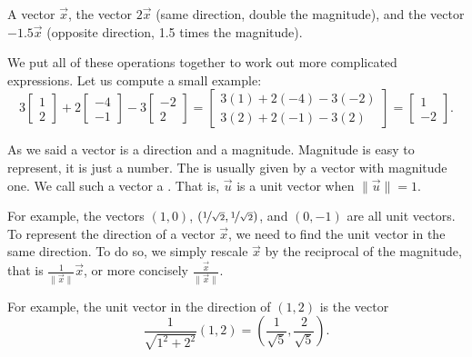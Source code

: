 \documentclass{ximera}
\begin{document}
\begin{myfig}
    \capstart
    
    \caption{A vector $\vec{x}$, the vector $2\vec{x}$ (same direction, double the magnitude), and the vector $-1.5\vec{x}$ (opposite direction, 1.5 times the magnitude).\label{linalg-vecscale:fig}}
\end{myfig}

We put all of these operations together to work out more complicated expressions. Let us compute a small example:
\begin{equation*}
    3
    \begin{bmatrix}
        1 \\ 2
    \end{bmatrix}
    + 2
    \begin{bmatrix}
        -4 \\ -1
    \end{bmatrix} 
    - 3
    \begin{bmatrix}
        -2 \\ 2
    \end{bmatrix} 
    =
    \begin{bmatrix}
        3(1)+2(-4)-3(-2) \\ 3(2)+2(-1)-3(2)
    \end{bmatrix}
    =
    \begin{bmatrix}
        1 \\ -2
    \end{bmatrix}
    .
\end{equation*}

\medskip

As we said a vector is a direction and a magnitude.  Magnitude is easy to represent, it is just a number.  The \emph{} is usually given by a vector with magnitude one.  We call such a vector a \emph{}.  That is, $\vec{u}$ is a unit vector when $\lVert \vec{u} \rVert = 1$.  

For example, the vectors $(1,0)$, $(\nicefrac{1}{\sqrt{2}},\nicefrac{1}{\sqrt{2}})$, and $(0,-1)$ are all unit vectors. To represent the direction of a vector $\vec{x}$, we need to find the unit vector in the same direction.  To do so, we simply rescale $\vec{x}$ by the reciprocal of the magnitude, that is $\frac{1}{\lVert \vec{x} \rVert} \vec{x}$, or more concisely $\frac{\vec{x}}{\lVert \vec{x} \rVert}$. 

For example, the unit vector in the direction of $(1,2)$ is the vector
\begin{equation*}
    \frac{1}{\sqrt{1^2+2^2}} (1,2) = \left( \frac{1}{\sqrt{5}}, \frac{2}{\sqrt{5}} \right) .
\end{equation*}
\end{document}
